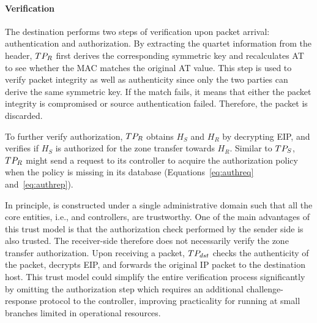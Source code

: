 


\paragraph{Verification}
The destination \tp performs two steps of verification upon packet arrival: authentication
and authorization. By extracting the quartet information from 
the header, $TP_R$ first derives the corresponding symmetric key and recalculates AT to
see whether the MAC matches the original AT value. This step is used to verify packet
integrity as well as authenticity since only the two parties can derive the same 
symmetric key. If the match fails, it means that either the packet integrity is compromised
or source authentication failed. Therefore, the packet is discarded.

To further verify authorization, $TP_R$ obtains $H_S$ and $H_R$ by decrypting EIP, and 
verifies if $H_S$ is authorized for the zone transfer towards $H_R$. Similar to $TP_S$,
$TP_R$ might send a request to its controller to acquire the authorization policy when
the policy is missing in its database (Equations~\ref{eq:authreq} and~\ref{eq:authrep}). 

In principle, \name is constructed under a single administrative domain such that all the 
core entities, i.e., \tps and controllers, are trustworthy. One of the main advantages of 
this trust model is that the authorization check performed by the sender side \tp is also 
trusted. The receiver-side \tp therefore does not necessarily verify the zone transfer 
authorization. Upon receiving a packet, $TP_{dst}$ checks the authenticity of the packet, 
decrypts EIP, and forwards the original IP packet to the destination host. This trust
model could simplify the entire verification process significantly by omitting the
authorization step which requires an additional challenge-response protocol to the 
controller, improving practicality for \tps running at small branches limited in 
operational resources. 

